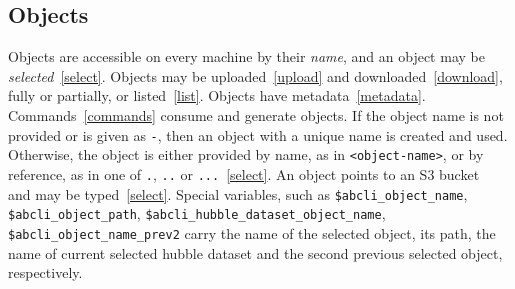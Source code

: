 \subsection{Objects}
\label{objects}

Objects are accessible on every machine by their \emph{name}, and an object may be \emph{selected}~\ref{select}. Objects may be uploaded~\ref{upload} and downloaded~\ref{download}, fully or partially, or listed~\ref{list}. Objects have metadata~\ref{metadata}. Commands~\ref{commands} consume and generate objects. If the object name is not provided or is given as \texttt{-}, then an object with a unique name is created and used. Otherwise, the object is either provided by name, as in \texttt{<object-name>}, or by reference, as in one of \texttt{.}, \texttt{..} or \texttt{...}~\ref{select}. An object points to an S3 bucket~ and may be typed~\ref{select}. Special variables, such as \texttt{\$abcli\_object\_name}, \texttt{\$abcli\_object\_path}, \texttt{\$abcli\_hubble\_dataset\_object\_name}, \texttt{\$abcli\_object\_name\_prev2} carry the name of the selected object, its path, the name of current selected hubble dataset and the second previous selected object, respectively.







